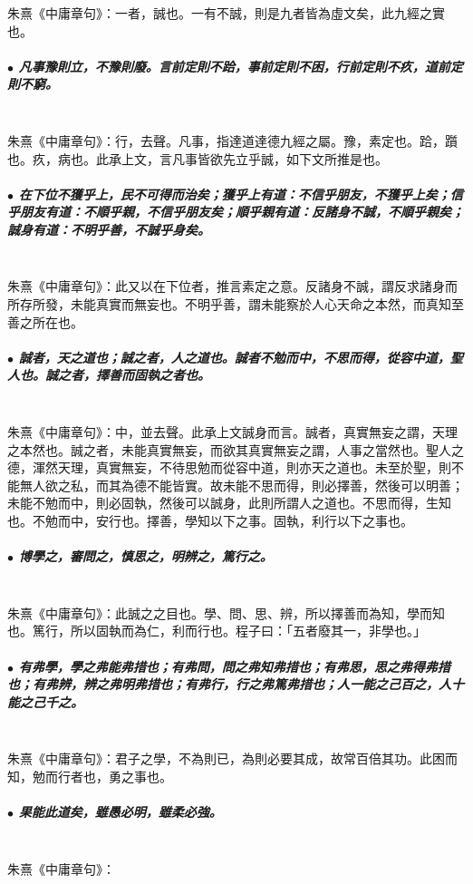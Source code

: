 \documentclass[hyperref, UTF8, 12pt, a4paper]{ctexrep}
\begin{document}
朱熹《中庸章句》：一者，誠也。一有不誠，則是九者皆為虛文矣，此九經之實也。

\subparagraph{$\bullet$ 凡事豫則立，不豫則廢。言前定則不跲，事前定則不困，行前定則不疚，道前定則不窮。} ~\\

朱熹《中庸章句》：行，去聲。凡事，指達道達德九經之屬。豫，素定也。跲，躓也。疚，病也。此承上文，言凡事皆欲先立乎誠，如下文所推是也。

\subparagraph{$\bullet$ 在下位不獲乎上，民不可得而治矣；獲乎上有道：不信乎朋友，不獲乎上矣；信乎朋友有道：不順乎親，不信乎朋友矣；順乎親有道：反諸身不誠，不順乎親矣；誠身有道：不明乎善，不誠乎身矣。} ~\\

朱熹《中庸章句》：此又以在下位者，推言素定之意。反諸身不誠，謂反求諸身而所存所發，未能真實而無妄也。不明乎善，謂未能察於人心天命之本然，而真知至善之所在也。

\subparagraph{$\bullet$ 誠者，天之道也；誠之者，人之道也。誠者不勉而中，不思而得，從容中道，聖人也。誠之者，擇善而固執之者也。} ~\\

朱熹《中庸章句》：中，並去聲。此承上文誠身而言。誠者，真實無妄之謂，天理之本然也。誠之者，未能真實無妄，而欲其真實無妄之謂，人事之當然也。聖人之德，渾然天理，真實無妄，不待思勉而從容中道，則亦天之道也。未至於聖，則不能無人欲之私，而其為德不能皆實。故未能不思而得，則必擇善，然後可以明善；未能不勉而中，則必固執，然後可以誠身，此則所謂人之道也。不思而得，生知也。不勉而中，安行也。擇善，學知以下之事。固執，利行以下之事也。

\subparagraph{$\bullet$ 博學之，審問之，慎思之，明辨之，篤行之。} ~\\

朱熹《中庸章句》：此誠之之目也。學、問、思、辨，所以擇善而為知，學而知也。篤行，所以固執而為仁，利而行也。程子曰：「五者廢其一，非學也。」

\subparagraph{$\bullet$ 有弗學，學之弗能弗措也；有弗問，問之弗知弗措也；有弗思，思之弗得弗措也；有弗辨，辨之弗明弗措也；有弗行，行之弗篤弗措也；人一能之己百之，人十能之己千之。} ~\\

朱熹《中庸章句》：君子之學，不為則已，為則必要其成，故常百倍其功。此困而知，勉而行者也，勇之事也。

\subparagraph{$\bullet$ 果能此道矣，雖愚必明，雖柔必強。} ~\\

朱熹《中庸章句》：
\end{document}
